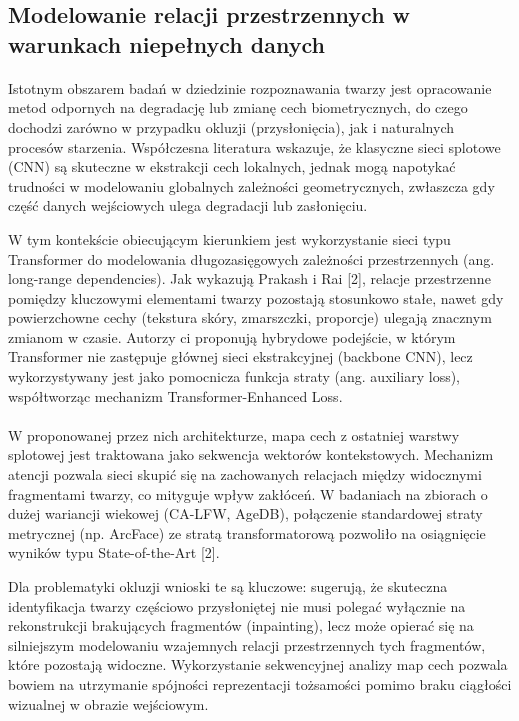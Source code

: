 \subsection{Modelowanie relacji przestrzennych w warunkach niepełnych danych}

\paragraph{}Istotnym obszarem badań w dziedzinie rozpoznawania twarzy jest opracowanie metod odpornych na degradację lub zmianę cech biometrycznych, do czego dochodzi zarówno w przypadku okluzji (przysłonięcia), jak i naturalnych procesów starzenia. Współczesna literatura wskazuje, że klasyczne sieci splotowe (CNN) są skuteczne w ekstrakcji cech lokalnych, jednak mogą napotykać trudności w modelowaniu globalnych zależności geometrycznych, zwłaszcza gdy część danych wejściowych ulega degradacji lub zasłonięciu.

W tym kontekście obiecującym kierunkiem jest wykorzystanie sieci typu Transformer do modelowania długozasięgowych zależności przestrzennych (ang. long-range dependencies). Jak wykazują Prakash i Rai [2], relacje przestrzenne pomiędzy kluczowymi elementami twarzy pozostają stosunkowo stałe, nawet gdy powierzchowne cechy (tekstura skóry, zmarszczki, proporcje) ulegają znacznym zmianom w czasie. Autorzy ci proponują hybrydowe podejście, w którym Transformer nie zastępuje głównej sieci ekstrakcyjnej (backbone CNN), lecz wykorzystywany jest jako pomocnicza funkcja straty (ang. auxiliary loss), współtworząc mechanizm Transformer-Enhanced Loss.

\paragraph{}W proponowanej przez nich architekturze, mapa cech z ostatniej warstwy splotowej jest traktowana jako sekwencja wektorów kontekstowych. Mechanizm atencji pozwala sieci skupić się na zachowanych relacjach między widocznymi fragmentami twarzy, co mityguje wpływ zakłóceń. W badaniach na zbiorach o dużej wariancji wiekowej (CA-LFW, AgeDB), połączenie standardowej straty metrycznej (np. ArcFace) ze stratą transformatorową pozwoliło na osiągnięcie wyników typu State-of-the-Art [2].

Dla problematyki okluzji wnioski te są kluczowe: sugerują, że skuteczna identyfikacja twarzy częściowo przysłoniętej nie musi polegać wyłącznie na rekonstrukcji brakujących fragmentów (inpainting), lecz może opierać się na silniejszym modelowaniu wzajemnych relacji przestrzennych tych fragmentów, które pozostają widoczne. Wykorzystanie sekwencyjnej analizy map cech pozwala bowiem na utrzymanie spójności reprezentacji tożsamości pomimo braku ciągłości wizualnej w obrazie wejściowym.
